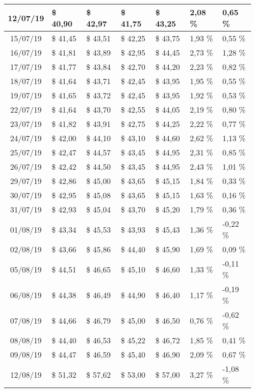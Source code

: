 \begin{center}
\begin{longtable}{|c|p{1.5cm}|p{1.5cm}|p{1.5cm}|p{1.5cm}|p{1.5cm}|p{1.5cm}|}
12/07/19 & \$ 40,90 & \$ 42,97 & \$ 41,75 & \$ 43,25 & 2,08 \% & 0,65 \% \\ \hline
15/07/19 & \$ 41,45 & \$ 43,51 & \$ 42,25 & \$ 43,75 & 1,93 \% & 0,55 \% \\ \hline
16/07/19 & \$ 41,81 & \$ 43,89 & \$ 42,95 & \$ 44,45 & 2,73 \% & 1,28 \% \\ \hline
17/07/19 & \$ 41,77 & \$ 43,84 & \$ 42,70 & \$ 44,20 & 2,23 \% & 0,82 \% \\ \hline
18/07/19 & \$ 41,64 & \$ 43,71 & \$ 42,45 & \$ 43,95 & 1,95 \% & 0,55 \% \\ \hline
19/07/19 & \$ 41,65 & \$ 43,72 & \$ 42,45 & \$ 43,95 & 1,92 \% & 0,53 \% \\ \hline
22/07/19 & \$ 41,64 & \$ 43,70 & \$ 42,55 & \$ 44,05 & 2,19 \% & 0,80 \% \\ \hline
23/07/19 & \$ 41,82 & \$ 43,91 & \$ 42,75 & \$ 44,25 & 2,22 \% & 0,77 \% \\ \hline
24/07/19 & \$ 42,00 & \$ 44,10 & \$ 43,10 & \$ 44,60 & 2,62 \% & 1,13 \% \\ \hline
25/07/19 & \$ 42,47 & \$ 44,57 & \$ 43,45 & \$ 44,95 & 2,31 \% & 0,85 \% \\ \hline
26/07/19 & \$ 42,42 & \$ 44,50 & \$ 43,45 & \$ 44,95 & 2,43 \% & 1,01 \% \\ \hline
29/07/19 & \$ 42,86 & \$ 45,00 & \$ 43,65 & \$ 45,15 & 1,84 \% & 0,33 \% \\ \hline
30/07/19 & \$ 42,95 & \$ 45,08 & \$ 43,65 & \$ 45,15 & 1,63 \% & 0,16 \% \\ \hline
31/07/19 & \$ 42,93 & \$ 45,04 & \$ 43,70 & \$ 45,20 & 1,79 \% & 0,36 \% \\ \hline
01/08/19 & \$ 43,34 & \$ 45,53 & \$ 43,93 & \$ 45,43 & 1,36 \% & -0,22 \% \\ \hline
02/08/19 & \$ 43,66 & \$ 45,86 & \$ 44,40 & \$ 45,90 & 1,69 \% & 0,09 \% \\ \hline
05/08/19 & \$ 44,51 & \$ 46,65 & \$ 45,10 & \$ 46,60 & 1,33 \% & -0,11 \% \\ \hline
06/08/19 & \$ 44,38 & \$ 46,49 & \$ 44,90 & \$ 46,40 & 1,17 \% & -0,19 \% \\ \hline
07/08/19 & \$ 44,66 & \$ 46,79 & \$ 45,00 & \$ 46,50 & 0,76 \% & -0,62 \% \\ \hline
08/08/19 & \$ 44,40 & \$ 46,53 & \$ 45,22 & \$ 46,72 & 1,85 \% & 0,41 \% \\ \hline
09/08/19 & \$ 44,47 & \$ 46,59 & \$ 45,40 & \$ 46,90 & 2,09 \% & 0,67 \% \\ \hline
12/08/19 & \$ 51,32 & \$ 57,62 & \$ 53,00 & \$ 57,00 & 3,27 \% & -1,08 \% \\ \hline

\end{longtable}
\end{center}
